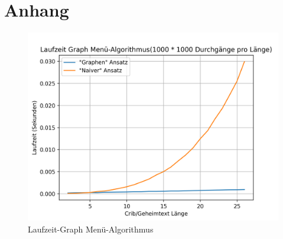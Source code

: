 \documentclass[ngerman, a4paper, footsepline, headsepline]{scrreport}
\newcommand{\fmbox}[1]{
	\begin{center}
		\fcolorbox{black}{yellow}
		{\parbox{0.88\textwidth}
			{\textcolor{black}
				{#1}
			}
		}
	\end{center}
}
\begin{document}
	
	
%	
%	
%	
%	
%	
%	
%	
%	
%	
%	
%	
	\chapter{Anhang}
	\begin{figure}[htbp]
		\centering
		\includegraphics[width=.7\linewidth]{Turing Bomb/Crib-Cipher Loop/Runtime Graph Graph vs Force.png}
		\caption{Laufzeit-Graph Menü-Algorithmus}
		\label{app:menu_runtime}
	\end{figure}
\end{document}

